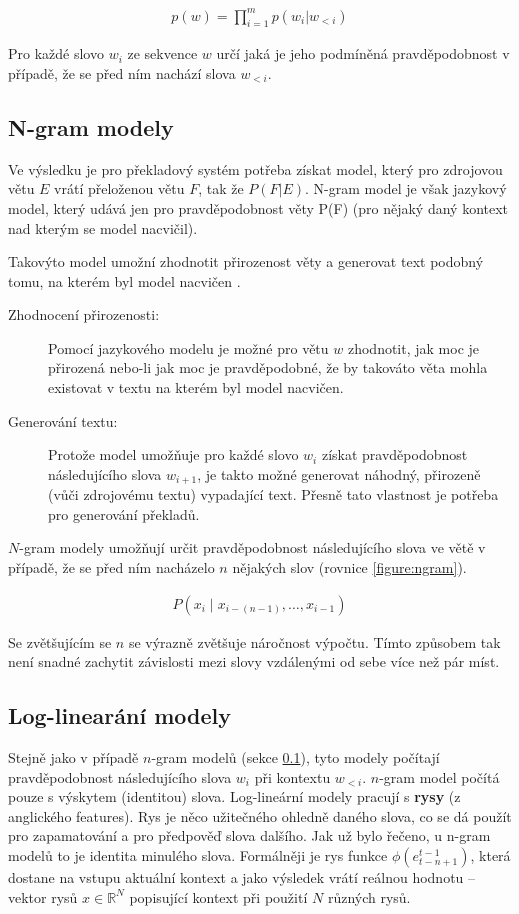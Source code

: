 \begin{align}\label{figure:probdistr}
  p(w) = \prod_{i=1}^{m} p(w_i|w_{<i})
\end{align}

Pro každé slovo $w_i$ ze sekvence $w$ určí jaká je jeho podmíněná pravděpodobnost v případě, že se před ním nachází slova $w_{<i}$.

\subsection{N-gram modely}\label{subsection:ngram}
Ve výsledku je pro překladový systém potřeba získat model, který pro zdrojovou větu $E$ vrátí přeloženou větu $F$, tak že $P(F|E)$. N-gram model je však jazykový model, který udává jen pro pravděpodobnost věty P(F) (pro nějaký daný kontext nad kterým se model nacvičil).

Takovýto model umožní zhodnotit přirozenost věty a generovat text podobný tomu, na kterém byl model nacvičen \cite{nmtTutorial}.

\begin{description}
  \item[Zhodnocení přirozenosti:] Pomocí jazykového modelu je možné pro větu $w$ zhodnotit, jak moc je přirozená nebo-li jak moc je pravděpodobné, že by takováto věta mohla existovat v textu na kterém byl model nacvičen.
  \item[Generování textu:] Protože model umožňuje pro každé slovo $w_i$ získat pravděpodobnost následujícího slova $w_{i+1}$, je takto možné generovat náhodný, přirozeně (vůči zdrojovému textu) vypadající text. Přesně tato vlastnost je potřeba pro generování překladů.
\end{description}

$N$-gram modely umožňují určit pravděpodobnost následujícího slova ve větě v případě, že se před ním nacházelo $n$ nějakých slov (rovnice \ref{figure:ngram}).

\begin{align}\label{figure:ngram}
    P(x_{i}\mid x_{{i-(n-1)}},\dots ,x_{{i-1}})
\end{align}

Se zvětšujícím se $n$ se výrazně zvětšuje náročnost výpočtu. Tímto způsobem tak není snadné zachytit závislosti mezi slovy vzdálenými od sebe více než pár míst.

\subsection{Log-linearání modely} \label{subsection:loglinear}
Stejně jako v případě $n$-gram modelů (sekce \ref{subsection:ngram}), tyto modely počítají pravděpodobnost následujícího slova $w_i$ při kontextu $w_{<i}$. $n$-gram model počítá pouze s výskytem (identitou) slova. Log-lineární modely pracují s \textbf{rysy} (z anglického features). Rys je něco užitečného ohledně daného slova, co se dá použít pro zapamatování a pro předpověď slova dalšího. Jak už bylo řečeno, u n-gram modelů to je identita minulého slova. Formálněji je rys funkce $\phi(e^{t-1}_{t-n+1})$, která dostane na vstupu aktuální kontext a jako výsledek vrátí reálnou hodnotu -- vektor rysů $x \in \mathbb{R}^N$ popisující kontext při použití $N$ různých rysů.

